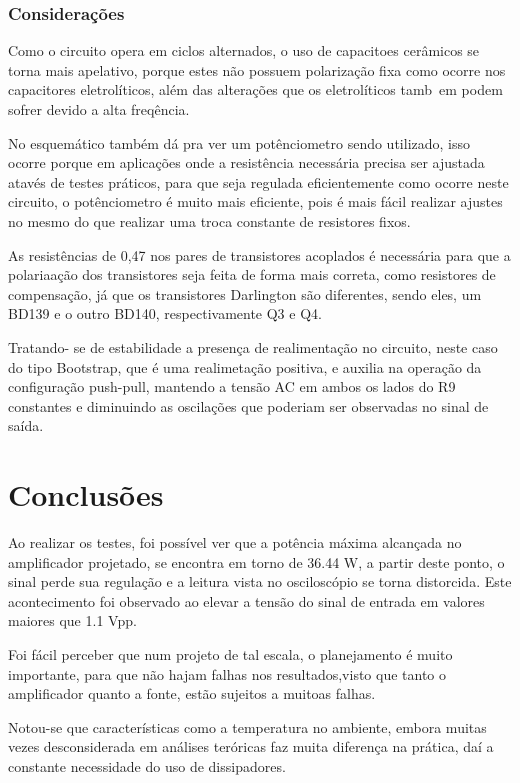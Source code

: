 \documentclass[a4paper,12pt,oneside,openany,table,xcdraw]{article}
\begin{document}
\vspace{0.4cm}


\subsubsection{Considerações}
Como o circuito opera em ciclos alternados, o uso de capacitoes cerâmicos se torna mais apelativo, porque estes não possuem polarização fixa como ocorre nos capacitores eletrolíticos, além das alterações que os eletrolíticos tamb~em podem sofrer devido a alta freqência.

No esquemático também dá pra ver um potênciometro sendo utilizado, isso ocorre porque em aplicações onde a resistência necessária precisa ser ajustada atavés de testes práticos, para que seja regulada eficientemente como ocorre neste circuito, o potênciometro é muito mais eficiente, pois é mais fácil realizar ajustes no mesmo do que realizar uma troca constante de resistores fixos.

As resistências de 0,47 nos pares de  transistores acoplados é necessária para que a polariaação dos transistores seja feita de forma mais correta, como resistores de compensação, já que os transistores Darlington são diferentes, sendo eles, um BD139 e o outro BD140, respectivamente Q3 e Q4.

Tratando- se de estabilidade a presença de realimentação no circuito, neste caso do tipo Bootstrap, que é uma realimetação positiva, e auxilia na operação da configuração push-pull, mantendo a tensão AC em ambos os lados do R9 constantes e diminuindo as oscilações que poderiam ser observadas no sinal de saída.
\newpage


\newpage
\section{Conclusões}
\label{projeto-final}
Ao realizar os testes, foi possível ver que a potência máxima alcançada no amplificador projetado, se encontra em torno de 36.44 W, a partir deste ponto, o sinal perde sua regulação e a leitura vista no osciloscópio se torna distorcida. Este acontecimento foi observado ao  elevar a tensão do sinal de entrada em valores maiores que 1.1 Vpp.

Foi fácil perceber que num projeto de tal escala, o planejamento é muito importante, para que não hajam falhas nos resultados,visto que tanto o amplificador quanto a fonte, estão sujeitos a muitoas falhas.

Notou-se que características como a temperatura no ambiente, embora muitas vezes desconsiderada em análises teróricas faz muita diferença na prática, daí a constante necessidade do uso de dissipadores.
\end{document}
